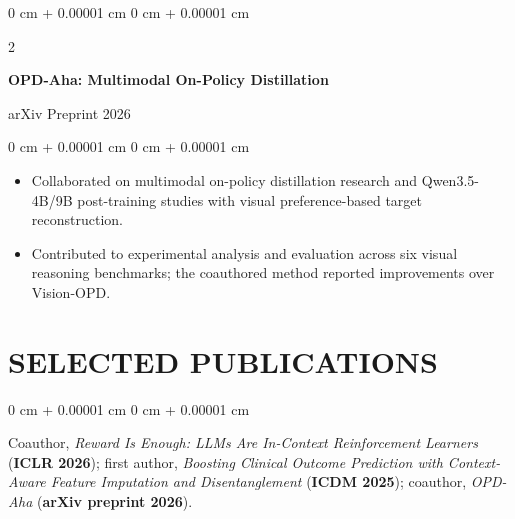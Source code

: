 \documentclass[10pt, letterpaper]{article}
\newenvironment{highlights}{
    \begin{itemize}[
        topsep=0.03 cm,
        parsep=0.03 cm,
        partopsep=0pt,
        itemsep=0pt,
        leftmargin=0 cm + 10pt
    ]
}{
    \end{itemize}
} %
\newenvironment{onecolentry}{
    \begin{adjustwidth}{
        0 cm + 0.00001 cm
    }{
        0 cm + 0.00001 cm
    }
}{
    \end{adjustwidth}
} %
\newenvironment{twocolentry}[2][]{
    \onecolentry
    \def\secondColumn{#2}
    \setcolumnwidth{\fill, 4.5 cm}
    \begin{paracol}{2}
}{
    \switchcolumn \raggedleft \secondColumn
    \end{paracol}
    \endonecolentry
} %
\begin{document}
\begin{twocolentry}{arXiv Preprint 2026}
\textbf{OPD-Aha: Multimodal On-Policy Distillation}
\end{twocolentry}
\begin{onecolentry}
\begin{highlights}
\item Collaborated on multimodal on-policy distillation research and Qwen3.5-4B/9B post-training studies with visual preference-based target reconstruction.
\item Contributed to experimental analysis and evaluation across six visual reasoning benchmarks; the coauthored method reported improvements over Vision-OPD.
\end{highlights}
\end{onecolentry}
\vspace{0.035 cm}
\section{SELECTED PUBLICATIONS}
\begin{onecolentry}
Coauthor, \textit{Reward Is Enough: LLMs Are In-Context Reinforcement Learners} (\textbf{ICLR 2026}); first author, \textit{Boosting Clinical Outcome Prediction with Context-Aware Feature Imputation and Disentanglement} (\textbf{ICDM 2025}); coauthor, \textit{OPD-Aha} (\textbf{arXiv preprint 2026}).
\end{onecolentry}
\end{document}
